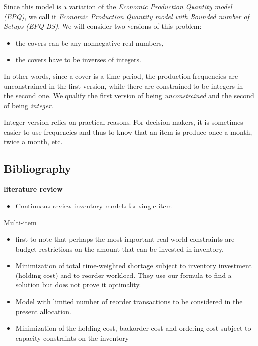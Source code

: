 \medskip


Since this model is a variation of the \emph{Economic Production Quantity model (EPQ)}, we call it \emph{Economic Production Quantity model with Bounded number of Setups (EPQ-BS)}.
We will consider two versions of this problem:
\begin{itemize}
  \item the covers can be any nonnegative real numbers,
  \item the covers have to be inverses of integers.
\end{itemize}
In other words, since a cover is a time period, the production frequencies are unconstrained in the first version, while there are constrained to be integers in the second one. We qualify the first version of being {\em unconstrained} and the second of being {\em integer}.


Integer version relies on practical reasons. For decision makers, it is sometimes easier to use frequencies and thus to know that an item is produce once a month, twice a month, etc.



\subsection{Bibliography}

\textbf{literature review}

\begin{itemize}
   \item \cite{Gayon2016} Continuous-review inventory models for single item
\end{itemize} 

Multi-item

\begin{itemize}
  \item \cite{Hadley1963} first to note that perhaps the most important real world constraints are budget restrictions on the amount that can be invested in inventory.
  \item \cite{Schrady1971} Minimization of total time-weighted shortage subject to inventory investment (holding cost) and to reorder workload. They use our formula to find a solution but does not prove it optimality.
  \item \cite{Daeschner1975} Model with limited number of reorder transactions to be considered in the present allocation.
  \item \cite{Ohno2001} Minimization of the holding cost, backorder cost and ordering cost subject to capacity constraints on the inventory.
\end{itemize}



